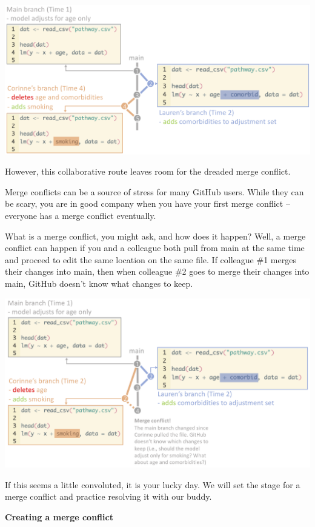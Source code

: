 \documentclass[
]{book}
\begin{document}
\includegraphics[width=1\linewidth]{./figures/no-conflict}

However, this collaborative route leaves room for the dreaded merge conflict.

Merge conflicts can be a source of stress for many GitHub users. While they can
be scary, you are in good company when you have your first merge conflict --
everyone has a merge conflict eventually.

What is a merge conflict, you might ask, and how does it happen? Well, a merge
conflict can happen if you and a colleague both pull from main at the same
time and proceed to edit the same location on the same file. If colleague \#1
merges their changes into main, then when colleague \#2
goes to merge their changes into main, GitHub doesn't know what changes to keep.

\includegraphics[width=1\linewidth]{./figures/conflict}

If this seems a little convoluted, it is your lucky day. We will set the stage
for a merge conflict and practice resolving it with our buddy.

\textbf{Creating a merge conflict}
\end{document}
